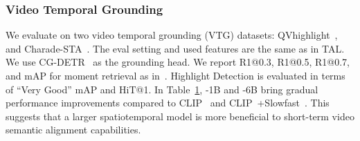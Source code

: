 \begin{table}[!t]
{\begin{subtable}[t]{.5\linewidth}
{\begin{tabular}{lcccc}
            \bottomrule
          \end{tabular}

		}
	\end{subtable}
 }
\label{tab:grounding} 
\end{table}

\subsubsection{Video Temporal Grounding} \label{sec:ground}

We evaluate {\modelname} on two video temporal grounding (VTG) datasets: QVhighlight~\cite{lei2021qvhighlights}, and Charade-STA~\cite{charades_sta}. The eval setting and used features are the same as in TAL.
We use CG-DETR~\cite{moon2023cg-detr} as the grounding head. 
We report R1@0.3, R1@0.5, R1@0.7, and mAP for moment retrieval as in~\cite{lei2021qvhighlights,moon2023cg-detr,lin2023univtg}. Highlight Detection is evaluated in terms of ``Very Good'' mAP and HiT@1.
In Table~\ref{tab:grounding}, \modelname-1B and \modelname-6B bring gradual performance improvements compared to CLIP~\cite{clip} and CLIP~\cite{clip}+Slowfast~\cite{slowfast}. This suggests that a larger spatiotemporal model is more beneficial to short-term video semantic alignment capabilities.

\begin{table}[!t]
\caption{Audio retrieval results on AudioCaps \cite{kim2019audiocaps}, Clothov1, and Clothov2 \cite{drossos2020clotho}. We report text-to-audio R@1 accuracy in zero-shot and finetuning settings. }
\centering
\small
{}
\label{tab:audio_retrieval}
\end{table}


